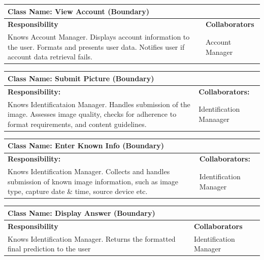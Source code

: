 \documentclass[]{article}
\begin{document}
	\begin{table}[H]
		\centering
		\begin{tabular}{|p{8cm}|p{8cm}|}
		\hline 
		\multicolumn{2}{|l|}{\textbf{Class Name:} View Account (Boundary)} \\
		\hline
		\textbf{Responsibility} & \textbf{Collaborators} \\
		\hline
		Knows Account Manager. \newline
		Displays account information to the user. \newline
		Formats and presents user data. \newline
		Notifies user if account data retrieval fails. 
		& Account Manager \\
		\hline
		\end{tabular}
	\end{table}
	

	\begin{table}[H]
		\centering
		\begin{tabular}{|p{8cm}|p{8cm}|}
		\hline 
		 \multicolumn{2}{|l|}{\textbf{Class Name:} Submit Picture (Boundary)} \\
		\hline
		\textbf{Responsibility:} & \textbf{Collaborators:} \\
		\hline
		Knows Identificataion Manager. \newline Handles submission of the image. \newline Assesses image quality, checks for adherence to format requirements, and content guidelines. & Identification Manaager \\
		\hline
		\end{tabular}
	\end{table}

	\begin{table}[H]
		\centering
		\begin{tabular}{|p{8cm}|p{8cm}|}
		\hline 
		 \multicolumn{2}{|l|}{\textbf{Class Name:} Enter Known Info (Boundary)} \\
		\hline
		\textbf{Responsibility:} & \textbf{Collaborators:} \\
		\hline
		Knows Identification Manager. \newline Collects and handles submission of known image information, such as image type, capture date \& time, source device etc. & Identification Manager \\
		\hline 
		\end{tabular}
	\end{table}

	\begin{table}[H]
		\centering
		\begin{tabular}{|p{8cm}|p{8cm}|}
		\hline
		\multicolumn{2}{|l|}{\textbf{Class Name:} Display Answer (Boundary)} \\
		\hline
		\textbf{Responsibility} & \textbf{Collaborators} \\
		\hline
		Knows Identification Manager. \newline Returns the formatted final prediction to the user & Identification Manager \\
		\hline
		\end{tabular}
	\end{table}
\end{document}
